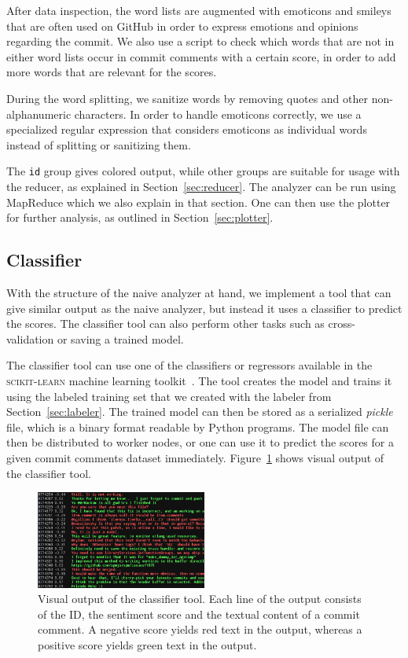 \documentclass{article}
\begin{document}
After data inspection, the word lists are augmented with emoticons and smileys 
that are often used on GitHub in order to express emotions and opinions 
regarding the commit. We also use a script to check which words that are not 
in either word lists occur in commit comments with a certain score, in order to 
add more words that are relevant for the scores.

During the word splitting, we sanitize words by removing quotes and other 
non-alphanumeric characters. In order to handle emoticons correctly, we use 
a specialized regular expression that considers emoticons as individual words 
instead of splitting or sanitizing them.

The {\tt id} group gives colored output, while other groups are suitable for 
usage with the reducer, as explained in Section~\ref{sec:reducer}. The analyzer
can be run using MapReduce which we also explain in that section. One can then
use the plotter for further analysis, as outlined in Section~\ref{sec:plotter}.

\subsection{Classifier}\label{sec:classifier}
With the structure of the naive analyzer at hand, we implement a tool that can 
give similar output as the naive analyzer, but instead it uses a classifier to
predict the scores. The classifier tool can also perform other tasks such as 
cross-validation or saving a trained model.

The classifier tool can use one of the classifiers or regressors available in
the \textsc{scikit-learn} machine learning toolkit~\cite{scikit-learn}. The tool
creates the model and trains it using the labeled training set that we created
with the labeler from Section~\ref{sec:labeler}. The trained model can then be
stored as a serialized \emph{pickle} file, which is a binary format readable by
Python programs. The model file can then be distributed to worker nodes, or one
can use it to predict the scores for a given commit comments dataset immediately.
Figure~\ref{fig:classifier-output} shows visual output of the classifier tool.

\begin{figure}[h!]
  \centering
  \includegraphics[width=0.5\textwidth]{Images/Classifier.png}
  \caption{Visual output of the classifier tool. Each line of the output
           consists of the ID, the sentiment score and the textual content of
           a commit comment. A negative score yields red text in the output,
           whereas a positive score yields green text in the
           output.}\label{fig:classifier-output}
\end{figure}
\end{document}
